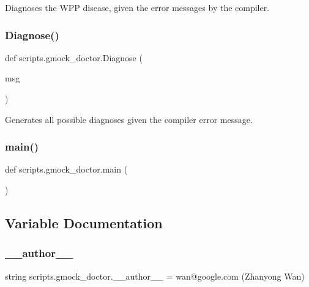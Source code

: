 \begin{DoxyVerb}Diagnoses the WPP disease, given the error messages by the compiler.\end{DoxyVerb}
 \mbox{\label{namespacescripts_1_1gmock__doctor_a7a23f6a3a8dc361e0b24afe89daf4b80}} 
\subsubsection{\texorpdfstring{Diagnose()}{Diagnose()}}
{\footnotesize\ttfamily def scripts.\+gmock\+\_\+doctor.\+Diagnose (\begin{DoxyParamCaption}\item[{}]{msg }\end{DoxyParamCaption})}

\begin{DoxyVerb}Generates all possible diagnoses given the compiler error message.\end{DoxyVerb}
 \mbox{\label{namespacescripts_1_1gmock__doctor_a1bededdb0621eefd9ac1d1d668142400}} 
\subsubsection{\texorpdfstring{main()}{main()}}
{\footnotesize\ttfamily def scripts.\+gmock\+\_\+doctor.\+main (\begin{DoxyParamCaption}{ }\end{DoxyParamCaption})}



\subsection{Variable Documentation}
\mbox{\label{namespacescripts_1_1gmock__doctor_a62ff35b79fcdc5bb65666d61573e540c}} 
\subsubsection{\texorpdfstring{\_\_author\_\_}{\_\_author\_\_}}
{\footnotesize\ttfamily string scripts.\+gmock\+\_\+doctor.\+\_\+\+\_\+author\+\_\+\+\_\+ = \textquotesingle{}wan@google.\+com (Zhanyong Wan)\textquotesingle{}\hspace{0.3cm}{\ttfamily [private]}}

